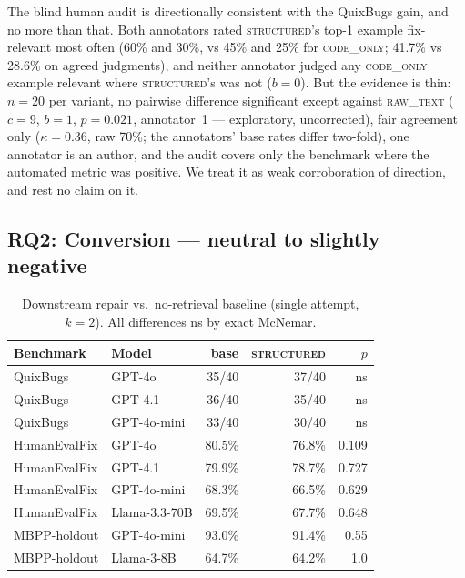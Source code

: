 \documentclass[10pt,conference]{IEEEtran}
\newcommand{\structured}{\textsc{structured}\xspace}
\newcommand{\codeonly}{\textsc{code\_only}\xspace}
\begin{document}
The blind human audit is directionally consistent with the QuixBugs gain,
and no more than that. Both annotators rated \structured's top-1 example
fix-relevant most often (60\% and 30\%, vs 45\% and 25\% for \codeonly;
41.7\% vs 28.6\% on agreed judgments), and neither annotator judged any
\codeonly example relevant where \structured's was not ($b{=}0$). But the
evidence is thin: $n{=}20$ per variant, no pairwise difference significant
except against \textsc{raw\_text} ($c{=}9$, $b{=}1$, $p{=}0.021$,
annotator~1 --- exploratory, uncorrected), fair agreement only
($\kappa{=}0.36$, raw 70\%; the annotators' base rates differ two-fold),
one annotator is an author, and the audit covers only the benchmark where
the automated metric was positive. We treat it as weak corroboration of
direction, and rest no claim on it.

\subsection{RQ2: Conversion --- neutral to slightly negative}

\begin{table}[!t]
\caption{Downstream repair vs.\ no-retrieval baseline (single attempt,
$k{=}2$). All differences ns by exact McNemar.}
\label{tab:downstream}
\centering
\begin{tabular}{llrrr}
\toprule
Benchmark & Model & base & \structured & $p$ \\
\midrule
QuixBugs & GPT-4o & 35/40 & 37/40 & ns \\
QuixBugs & GPT-4.1 & 36/40 & 35/40 & ns \\
QuixBugs & GPT-4o-mini & 33/40 & 30/40 & ns \\
HumanEvalFix & GPT-4o & 80.5\% & 76.8\% & 0.109 \\
HumanEvalFix & GPT-4.1 & 79.9\% & 78.7\% & 0.727 \\
HumanEvalFix & GPT-4o-mini & 68.3\% & 66.5\% & 0.629 \\
HumanEvalFix & Llama-3.3-70B & 69.5\% & 67.7\% & 0.648 \\
MBPP-holdout & GPT-4o-mini & 93.0\% & 91.4\% & 0.55 \\
MBPP-holdout & Llama-3-8B & 64.7\% & 64.2\% & 1.0 \\
\bottomrule
\end{tabular}
\end{table}
\end{document}
